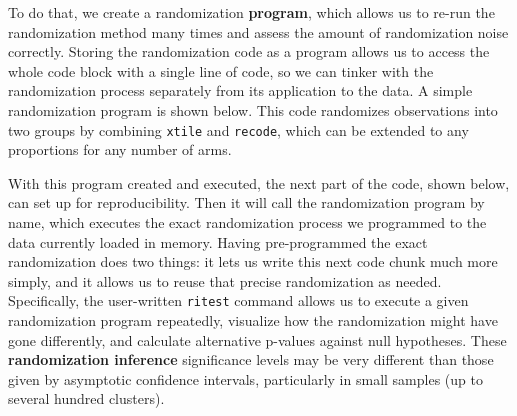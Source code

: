 To do that, we create a randomization \textbf{program}, which
allows us to re-run the randomization method many times
and assess the amount of randomization noise correctly.
Storing the randomization code as a program allows us to access the whole code block
with a single line of code, so we can tinker with the randomization process
separately from its application to the data.
A simple randomization program is shown below.
This code randomizes observations into two groups by combining
\texttt{xtile} and \texttt{recode},
which can be extended to any proportions for any number of arms.


{
}

With this program created and executed,
the next part of the code, shown below,
can set up for reproducibility.
Then it will call the randomization program by name,
which executes the exact randomization process we programmed
to the data currently loaded in memory.
Having pre-programmed the exact randomization does two things:
it lets us write this next code chunk much more simply,
and it allows us to reuse that precise randomization as needed.
Specifically, the user-written \texttt{ritest} command
allows us to execute a given randomization program repeatedly,
visualize how the randomization might have gone differently,
and calculate alternative p-values against null hypotheses.
These \textbf{randomization inference} significance levels may be very different
than those given by asymptotic confidence intervals,
particularly in small samples (up to several hundred clusters).


